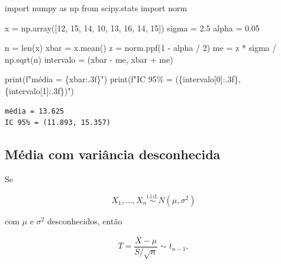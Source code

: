 \documentclass[
  letterpaper,
  DIV=11,
  numbers=noendperiod]{scrreprt}
\newenvironment{Shaded}{\begin{snugshade}}{\end{snugshade}}
\newcommand{\BuiltInTok}[1]{\textcolor[rgb]{0.00,0.23,0.31}{#1}}
\newcommand{\DecValTok}[1]{\textcolor[rgb]{0.68,0.00,0.00}{#1}}
\newcommand{\FloatTok}[1]{\textcolor[rgb]{0.68,0.00,0.00}{#1}}
\newcommand{\ImportTok}[1]{\textcolor[rgb]{0.00,0.46,0.62}{#1}}
\newcommand{\NormalTok}[1]{\textcolor[rgb]{0.00,0.23,0.31}{#1}}
\newcommand{\OperatorTok}[1]{\textcolor[rgb]{0.37,0.37,0.37}{#1}}
\newcommand{\SpecialCharTok}[1]{\textcolor[rgb]{0.37,0.37,0.37}{#1}}
\newcommand{\SpecialStringTok}[1]{\textcolor[rgb]{0.13,0.47,0.30}{#1}}
\begin{document}
\begin{Shaded}
\begin{Highlighting}[]
\ImportTok{import}\NormalTok{ numpy }\ImportTok{as}\NormalTok{ np}
\ImportTok{from}\NormalTok{ scipy.stats }\ImportTok{import}\NormalTok{ norm}

\NormalTok{x }\OperatorTok{=}\NormalTok{ np.array([}\DecValTok{12}\NormalTok{, }\DecValTok{15}\NormalTok{, }\DecValTok{14}\NormalTok{, }\DecValTok{10}\NormalTok{, }\DecValTok{13}\NormalTok{, }\DecValTok{16}\NormalTok{, }\DecValTok{14}\NormalTok{, }\DecValTok{15}\NormalTok{])}
\NormalTok{sigma }\OperatorTok{=} \FloatTok{2.5}
\NormalTok{alpha }\OperatorTok{=} \FloatTok{0.05}

\NormalTok{n }\OperatorTok{=} \BuiltInTok{len}\NormalTok{(x)}
\NormalTok{xbar }\OperatorTok{=}\NormalTok{ x.mean()}
\NormalTok{z }\OperatorTok{=}\NormalTok{ norm.ppf(}\DecValTok{1} \OperatorTok{{-}}\NormalTok{ alpha }\OperatorTok{/} \DecValTok{2}\NormalTok{)}
\NormalTok{me }\OperatorTok{=}\NormalTok{ z }\OperatorTok{*}\NormalTok{ sigma }\OperatorTok{/}\NormalTok{ np.sqrt(n)}
\NormalTok{intervalo }\OperatorTok{=}\NormalTok{ (xbar }\OperatorTok{{-}}\NormalTok{ me, xbar }\OperatorTok{+}\NormalTok{ me)}

\BuiltInTok{print}\NormalTok{(}\SpecialStringTok{f"média = }\SpecialCharTok{\{}\NormalTok{xbar}\SpecialCharTok{:.3f\}}\SpecialStringTok{"}\NormalTok{)}
\BuiltInTok{print}\NormalTok{(}\SpecialStringTok{f"IC 95\% = (}\SpecialCharTok{\{}\NormalTok{intervalo[}\DecValTok{0}\NormalTok{]}\SpecialCharTok{:.3f\}}\SpecialStringTok{, }\SpecialCharTok{\{}\NormalTok{intervalo[}\DecValTok{1}\NormalTok{]}\SpecialCharTok{:.3f\}}\SpecialStringTok{)"}\NormalTok{)}
\end{Highlighting}
\end{Shaded}

\begin{verbatim}
média = 13.625
IC 95% = (11.893, 15.357)
\end{verbatim}

\subsection{Média com variância
desconhecida}\label{muxe9dia-com-variuxe2ncia-desconhecida}

Se

\[X_1,\ldots,X_n\overset{\mathrm{i.i.d.}}{\sim}N(\mu,\sigma^2)\]

com \(\mu\) e \(\sigma^2\) desconhecidos, então

\[T=\frac{\overline X-\mu}{S/\sqrt n}\sim t_{n-1},\]
\end{document}
